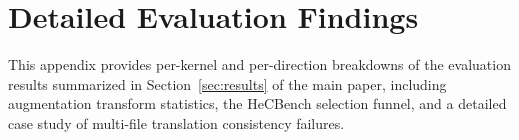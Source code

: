 




\section{Detailed Evaluation Findings}
\label{sec:appendix-e}

This appendix provides per-kernel and per-direction breakdowns of the evaluation
results summarized in Section~\ref{sec:results} of the main paper, including
augmentation transform statistics, the HeCBench selection funnel, and
a detailed case study of multi-file translation consistency failures.

